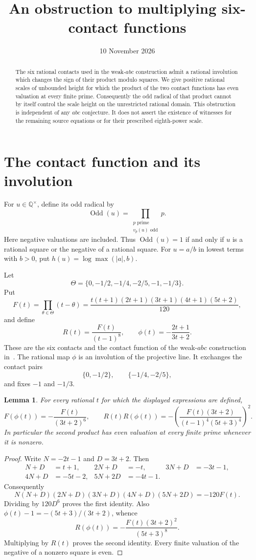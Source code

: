 \documentclass[11pt,a4paper]{article}
\title{An obstruction to multiplying six-contact functions}
\author{}\date{10 November 2026}
\newtheorem{lemma}[theorem]{Lemma}
\newcommand{\Q}{\mathbb Q}
\DeclareMathOperator{\Odd}{Odd}
\begin{document}
\maketitle
\begin{abstract}
The six rational contacts used in the weak-$abc$ construction admit
a rational involution which changes the sign of their product modulo
squares. We give positive rational scales of unbounded height for which
the product of the two contact functions has even valuation at every
finite prime. Consequently the odd radical of that product cannot by
itself control the scale height on the unrestricted rational domain.
This obstruction is independent of any $abc$ conjecture. It does not
assert the existence of witnesses for the remaining source equations
or for their prescribed eighth-power scale.
\end{abstract}

\section{The contact function and its involution}

For $u\in\Q^\times$, define its odd radical by
\[
             \Odd(u)=\prod_{\substack{p\text{ prime}\\v_p(u)\text{ odd}}}p.
\]
Here negative valuations are included. Thus $\Odd(u)=1$ if and only
if $u$ is a rational square or the negative of a rational square.
For $u=a/b$ in lowest terms with $b>0$, put
$h(u)=\log\max(|a|,b)$.

Let
\[
 \Theta=\{0,-1/2,-1/4,-2/5,-1,-1/3\}.
\]
Put
\[
 F(t)=\prod_{\theta\in\Theta}(t-\theta)
     =\frac{t(t+1)(2t+1)(3t+1)(4t+1)(5t+2)}{120},
\]
and define
\[
 R(t)=\frac{F(t)}{(t-1)^8},\qquad
 \phi(t)=-\frac{2t+1}{3t+2}.
\]
These are the six contacts and the contact function of the
weak-$abc$ construction in~\cite{Conditional}. The rational map
$\phi$ is an involution of the projective line. It exchanges the
contact pairs
\[
 \{0,-1/2\},\qquad\{-1/4,-2/5\},
\]
and fixes $-1$ and $-1/3$.

\begin{lemma}\label{lem:identity}
For every rational $t$ for which the displayed expressions are
defined,
\begin{equation}\label{eq:identity}
 F(\phi(t))=-\frac{F(t)}{(3t+2)^6},\qquad
 R(t)R(\phi(t))
 =-\left(\frac{F(t)(3t+2)}{(t-1)^4(5t+3)^4}\right)^2.
\end{equation}
In particular the second product has even valuation at every finite
prime whenever it is nonzero.
\end{lemma}
\begin{proof}
Write $N=-2t-1$ and $D=3t+2$. Then
\[
 \begin{aligned}
 N+D&=t+1,&2N+D&=-t,&3N+D&=-3t-1,\\
 4N+D&=-5t-2,&5N+2D&=-4t-1.
 \end{aligned}
\]
Consequently
\[
 N(N+D)(2N+D)(3N+D)(4N+D)(5N+2D)=-120F(t).
\]
Dividing by $120D^6$ proves the first identity. Also
$\phi(t)-1=-(5t+3)/(3t+2)$, whence
\[
 R(\phi(t))=-\frac{F(t)(3t+2)^2}{(5t+3)^8}.
\]
Multiplying by $R(t)$ proves the second identity. Every finite
valuation of the negative of a nonzero square is even.
\end{proof}
\end{document}
